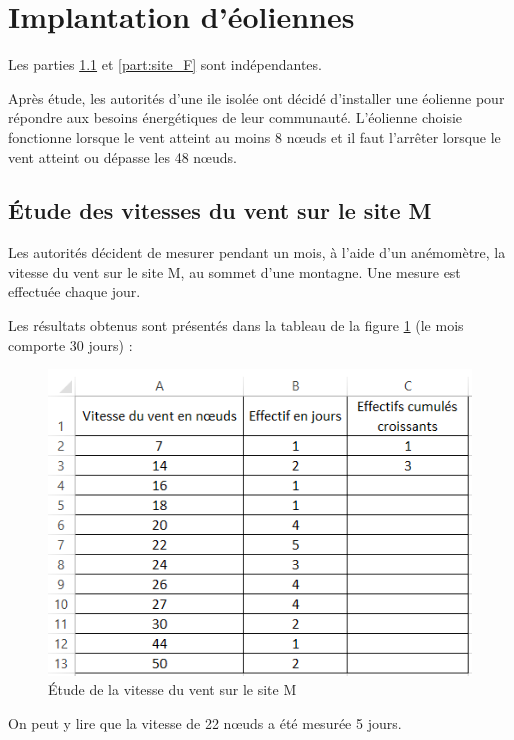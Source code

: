 \section{Implantation d'éoliennes}

Les parties \ref{part:site_M} et \ref{part:site_F} sont indépendantes.

Après étude, les autorités d'une ile isolée ont décidé d'installer une éolienne pour répondre aux besoins énergétiques de leur communauté. L'éolienne choisie fonctionne lorsque le vent atteint au moins 8 n\oe uds et il faut l'arrêter lorsque le vent atteint ou dépasse les 48 n\oe uds. 

\subsection{\'Etude des vitesses du vent sur le site M}\label{part:site_M}

Les autorités décident de mesurer pendant un mois, à l'aide d'un anémomètre, la vitesse du vent sur le site M, au sommet d'une montagne. Une mesure est effectuée chaque jour.

Les résultats obtenus sont présentés dans la tableau de la figure \ref{tab:site_M} (le mois comporte 30 jours) :

\begin{figure}[h]
	\begin{center}
	\includegraphics[scale=0.8]{eoliennes2}
\end{center}
\caption{\'Etude de la vitesse du vent sur le site M}
\label{tab:site_M}
\end{figure}

On peut y lire que la vitesse de 22 n\oe uds a été mesurée 5 jours.

